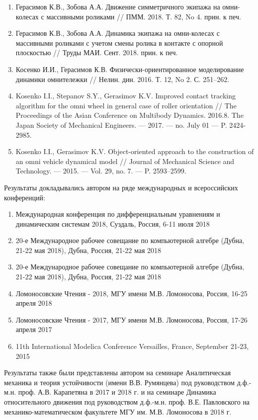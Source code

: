 \begin{enumerate}
	\item Герасимов К.В., Зобова А.А. Движение симметричного экипажа на омни-колесах с массивными роликами // ПММ. 2018. Т. 82, No 4. прин. к печ.	\item Герасимов К.В., Зобова А.А. Динамика экипажа на омни-колесах с массивными роликами с учетом смены ролика в контакте с опорной плоскостью // Труды МАИ. Сент. 2018. прин. к печ.	\item Косенко И.И., Герасимов К.В. Физически-ориентированное моделирование динамики омнитележки // Нелин. дин. 2016. Т. 12, No 2. С. 251–262.	\item Kosenko I.I., Stepanov S.Y., Gerasimov K.V. Improved contact tracking algorithm for the omni wheel in general case of roller orientation // The Proceedings of the Asian Conference on Multibody Dynamics. 2016.8. The Japan Society of Mechanical Engineers. — 2017. — no. July 01 — P. 2424-2985.	\item Kosenko I.I., Gerasimov K.V. Object-oriented approach to the construction of an omni vehicle dynamical model // Journal of Mechanical Science and Technology. — 2015. — Vol. 29, no. 7. — P. 2593–2599.\end{enumerate}Результаты докладывались автором на ряде международных и всероссийских конференций:\begin{enumerate}
	\item Международная конференция по дифференциальным уравнениям и динамическим системам 2018, Суздаль, Россия, 6-11 июля 2018
	\item 20-е Международное рабочее совещание по компьютерной алгебре (Дубна, 21-22 мая 2018), Дубна, Россия, 21-22 мая 2018	\item 20-е Международное рабочее совещание по компьютерной алгебре (Дубна, 21-22 мая 2018), Дубна, Россия, 21-22 мая 2018	\item Ломоносовские Чтения - 2018, МГУ имени М.В. Ломоносова, Россия, 16-25 апреля 2018	\item Ломоносовские Чтения - 2017, МГУ имени М.В. Ломоносова, Россия, 17-26 апреля 2017	\item 11th International Modelica Conference Versailles, France, September 21-23, 2015\end{enumerate}
Результаты также были представлены автором на семинаре Аналитическая механика и теория устойчивости (имени В.В. Румянцева) под руководством д.ф.-м.н. проф. А.В. Карапетяна в 2017 и 2018 г. и на семинаре Динамика относительного движения под руководством д.ф.-м.н. проф. В.Е. Павловского на механико-математическом факультете МГУ им. М.В. Ломоносова в 2018 г.

